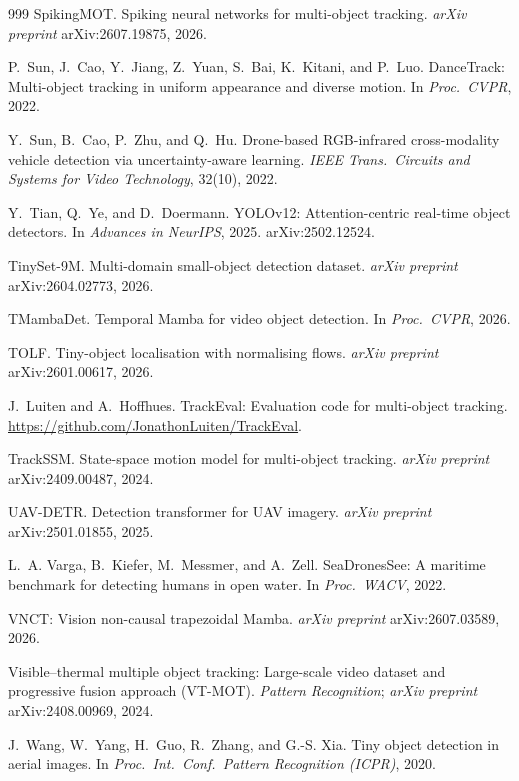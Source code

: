 \begin{thebibliography}{999}
SpikingMOT. Spiking neural networks for multi-object tracking.
\textit{arXiv preprint} arXiv:2607.19875, 2026.

P.~Sun, J.~Cao, Y.~Jiang, Z.~Yuan, S.~Bai, K.~Kitani, and P.~Luo.
DanceTrack: Multi-object tracking in uniform appearance and diverse motion.
In \textit{Proc.\ CVPR}, 2022.

Y.~Sun, B.~Cao, P.~Zhu, and Q.~Hu.
Drone-based RGB-infrared cross-modality vehicle detection via
uncertainty-aware learning. \textit{IEEE Trans.\ Circuits and Systems for
Video Technology}, 32(10), 2022.

Y.~Tian, Q.~Ye, and D.~Doermann.
YOLOv12: Attention-centric real-time object detectors.
In \textit{Advances in NeurIPS}, 2025. arXiv:2502.12524.

TinySet-9M. Multi-domain small-object detection dataset.
\textit{arXiv preprint} arXiv:2604.02773, 2026.

TMambaDet. Temporal Mamba for video object detection.
In \textit{Proc.\ CVPR}, 2026.

TOLF. Tiny-object localisation with normalising flows.
\textit{arXiv preprint} arXiv:2601.00617, 2026.

J.~Luiten and A.~Hoffhues.
TrackEval: Evaluation code for multi-object tracking.
\url{https://github.com/JonathonLuiten/TrackEval}.

TrackSSM. State-space motion model for multi-object tracking.
\textit{arXiv preprint} arXiv:2409.00487, 2024.

UAV-DETR. Detection transformer for UAV imagery.
\textit{arXiv preprint} arXiv:2501.01855, 2025.

L.~A. Varga, B.~Kiefer, M.~Messmer, and A.~Zell.
SeaDronesSee: A maritime benchmark for detecting humans in open water.
In \textit{Proc.\ WACV}, 2022.

VNCT: Vision non-causal trapezoidal Mamba.
\textit{arXiv preprint} arXiv:2607.03589, 2026.

Visible--thermal multiple object tracking: Large-scale video dataset and
progressive fusion approach (VT-MOT).
\textit{Pattern Recognition}; \textit{arXiv preprint} arXiv:2408.00969, 2024.

J.~Wang, W.~Yang, H.~Guo, R.~Zhang, and G.-S. Xia.
Tiny object detection in aerial images.
In \textit{Proc.\ Int.\ Conf.\ Pattern Recognition (ICPR)}, 2020.


\end{thebibliography}
